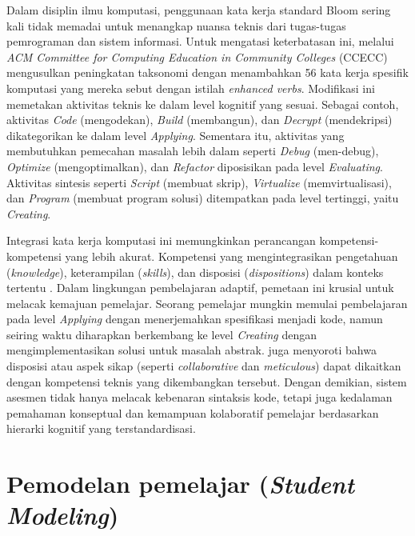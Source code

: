 Dalam disiplin ilmu komputasi, penggunaan kata kerja standard Bloom sering kali tidak memadai untuk menangkap nuansa teknis dari tugas-tugas pemrograman dan sistem informasi. Untuk mengatasi keterbatasan ini, \textcite{ACM2023} melalui \textit{ACM Committee for Computing Education in Community Colleges} (CCECC) mengusulkan peningkatan taksonomi dengan menambahkan 56 kata kerja spesifik komputasi yang mereka sebut dengan istilah \textit{enhanced verbs}. Modifikasi ini memetakan aktivitas teknis ke dalam level kognitif yang sesuai. Sebagai contoh, aktivitas \textit{Code} (mengodekan), \textit{Build} (membangun), dan \textit{Decrypt} (mendekripsi) dikategorikan ke dalam level \textit{Applying}. Sementara itu, aktivitas yang membutuhkan pemecahan masalah lebih dalam seperti \textit{Debug} (men-debug), \textit{Optimize} (mengoptimalkan), dan \textit{Refactor} diposisikan pada level \textit{Evaluating}. Aktivitas sintesis seperti \textit{Script} (membuat skrip), \textit{Virtualize} (memvirtualisasi), dan \textit{Program} (membuat program solusi) ditempatkan pada level tertinggi, yaitu \textit{Creating}.

Integrasi kata kerja komputasi ini memungkinkan perancangan kompetensi-kompetensi yang lebih akurat. Kompetensi yang mengintegrasikan pengetahuan (\textit{knowledge}), keterampilan (\textit{skills}), dan disposisi (\textit{dispositions}) dalam konteks tertentu \autocite{ACM2023}. Dalam lingkungan pembelajaran adaptif, pemetaan ini krusial untuk melacak kemajuan pemelajar. Seorang pemelajar mungkin memulai pembelajaran pada level \textit{Applying} dengan menerjemahkan spesifikasi menjadi kode, namun seiring waktu diharapkan berkembang ke level \textit{Creating} dengan mengimplementasikan solusi untuk masalah abstrak. \textcite{ACM2023} juga menyoroti bahwa disposisi atau aspek sikap (seperti \textit{collaborative} dan \textit{meticulous}) dapat dikaitkan dengan kompetensi teknis yang dikembangkan tersebut. Dengan demikian, sistem asesmen tidak hanya melacak kebenaran sintaksis kode, tetapi juga kedalaman pemahaman konseptual dan kemampuan kolaboratif pemelajar berdasarkan hierarki kognitif yang terstandardisasi.

\section{Pemodelan pemelajar (\textit{Student Modeling})}
\label{sec:student_modeling}

